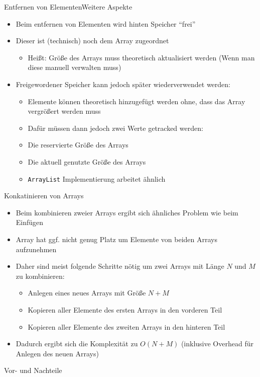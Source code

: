\begin{frame}{Entfernen von Elementen}{Weitere Aspekte}
	\begin{itemize}
		\item Beim entfernen von Elementen wird hinten Speicher "`frei"'
		\item Dieser ist (technisch) noch dem Array zugeordnet
		\begin{itemize}
			\item Heißt: Größe des Arrays muss theoretisch aktualisiert werden (Wenn man diese manuell verwalten muss)
		\end{itemize}
		\item Freigewordener Speicher kann jedoch später wiederverwendet werden:
		\begin{itemize}
			\item Elemente können theoretisch hinzugefügt werden ohne, dass das Array vergrößert werden muss
			\item Dafür müssen dann jedoch zwei Werte getracked werden:
			\item Die reservierte Größe des Arrays
			\item Die aktuell genutzte Größe des Arrays
			\item \texttt{ArrayList} Implementierung arbeitet ähnlich
		\end{itemize}
	\end{itemize}
\end{frame}

\begin{frame}{Konkatinieren von Arrays}
	\begin{itemize}
		\item Beim kombinieren zweier Arrays ergibt sich ähnliches Problem wie beim Einfügen
		\item Array hat ggf. nicht genug Platz um Elemente von beiden Arrays aufzunehmen
		\item Daher sind meist folgende Schritte nötig um zwei Arrays mit Länge $N$ und $M$ zu kombinieren:
		\begin{itemize}
			\item Anlegen eines neues Arrays mit Größe $N+M$
			\item Kopieren aller Elemente des ersten Arrays in den vorderen Teil
			\item Kopieren aller Elemente des zweiten Arrays in den hinteren Teil
		\end{itemize}
		\item Dadurch ergibt sich die Komplexität zu $O(N+M)$ (inklusive Overhead für Anlegen des neuen Arrays)
	\end{itemize}
\end{frame}

\begin{frame}{Vor- und Nachteile}
\end{frame}